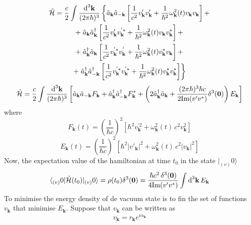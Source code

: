 \begin{multline}
	\hat{\mathcal{H}}=\frac{c}{2}\int\frac{\text{d}^3\mathbf{k}}{(2\pi\hbar)^3}\left\{\hat{a}_\mathbf{k}\hat{a}_{-\mathbf{k}}\left[\frac{1}{c^2}v'_\mathbf{k}v'_\mathbf{k}+\frac{1}{\hbar^2}\omega^2_\mathbf{k}(t)v_\mathbf{k}v_\mathbf{k}\right]+\right.\\
	+\left.\hat{a}_\mathbf{k}\hat{a}^\dagger_\mathbf{k}\left[\frac{1}{c^2}v'_\mathbf{k}v^{'*}_\mathbf{k}+\frac{1}{\hbar^2}\omega^2_\mathbf{k}(t)v_\mathbf{k}v^*_\mathbf{k}\right]+\right.\\
	+\left.\hat{a}^\dagger_\mathbf{k}\hat{a}_\mathbf{k}\left[\frac{1}{c^2}v^{'*}_\mathbf{k}v^{'}_\mathbf{k}+\frac{1}{\hbar^2}\omega^2_\mathbf{k}(t)v^*_\mathbf{k}v_\mathbf{k}\right]+\right.\\
	+\left.\hat{a}^\dagger_\mathbf{k}\hat{a}^\dagger_{-\mathbf{k}}\left[\frac{1}{c^2}v^{'*}_\mathbf{k}v^{'*}_\mathbf{k}+\frac{1}{\hbar^2}\omega^2_\mathbf{k}(t)v^*_\mathbf{k}v^*_\mathbf{k}\right]\right\}
\end{multline}
\begin{equation}
	\hat{\mathcal{H}}=\frac{c}{2}\int\frac{\text{d}^3\mathbf{k}}{(2\pi\hbar)^3}\left[\hat{a}_\mathbf{k}\hat{a}_{-\mathbf{k}}F_\mathbf{k}+\hat{a}^\dagger_\mathbf{k}\hat{a}^\dagger_{-\mathbf{k}}F_\mathbf{k}^*+\left(2\hat{a}_\mathbf{k}^\dagger\hat{a}_\mathbf{k}+\frac{(2\pi\hbar)^3\hbar c}{2\text{Im}(v'v^*)}\delta^3(\mathbf{0})\right)E_\mathbf{k}\right]
\end{equation}
where
\begin{equation}
	F_\mathbf{k}(t)=\left(\frac{1}{\hbar c}\right)^2\left[\hbar^2v^{'2}_\mathbf{k}+\omega^2_\mathbf{k}(t)\,c^2 v_\mathbf{k}^2\right]
\end{equation}
\begin{equation}
	E_\mathbf{k}(t)=\left(\frac{1}{\hbar c}\right)^2\left[\hbar^2\big|v'_\mathbf{k}\big|^2+\omega^2_\mathbf{k}(t)\,c^2 \big|v_\mathbf{k}\big|^2\right]
\end{equation}
Now, the expectation value of the hamiltonian at time $t_0$ in the state $|_{(v)}0\rangle$
\begin{equation}
	\langle_{(v)}0|\hat{\mathcal{H}}(t_0)|_{(v)}0\rangle=\rho(t_0)\delta^3(\mathbf{0})=\frac{\hbar c^2 \,\delta^3(\mathbf{0})}{4\text{Im}(v'v^*)}\int\text{d}^3\mathbf{k}\,E_\mathbf{k}
\end{equation}
To minimise the energy density of de vacuum state is to fin the set of functions $v_\mathbf{k}$ that minimise $E_\mathbf{k}$. Suppose that $v_\mathbf{k}$ can be written as
\begin{equation}
	v_\mathbf{k}=r_\mathbf{k}e^{i\alpha_\mathbf{k}}
\end{equation}
